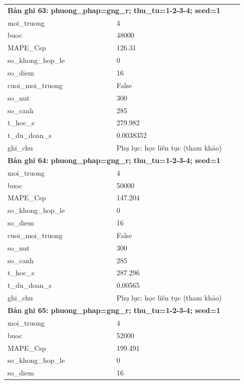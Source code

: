 \begin{longtable}{p{0.43\linewidth}p{0.50\linewidth}}
\midrule
\multicolumn{2}{p{0.95\linewidth}}{\textbf{Bản ghi 63: phuong\_phap=gng\_r; thu\_tu=1-2-3-4; seed=1}} \\
moi\_\allowbreak truong & 4 \\
buoc & 48000 \\
MAPE\_\allowbreak Csp & 126.31 \\
so\_\allowbreak khong\_\allowbreak hop\_\allowbreak le & 0 \\
so\_\allowbreak diem & 16 \\
cuoi\_\allowbreak moi\_\allowbreak truong & False \\
so\_\allowbreak nut & 300 \\
so\_\allowbreak canh & 285 \\
t\_\allowbreak hoc\_\allowbreak s & 279.982 \\
t\_\allowbreak du\_\allowbreak doan\_\allowbreak s & 0.0038352 \\
ghi\_\allowbreak chu & Phụ lục: học liên tục (tham khảo) \\
\midrule
\multicolumn{2}{p{0.95\linewidth}}{\textbf{Bản ghi 64: phuong\_phap=gng\_r; thu\_tu=1-2-3-4; seed=1}} \\
moi\_\allowbreak truong & 4 \\
buoc & 50000 \\
MAPE\_\allowbreak Csp & 147.204 \\
so\_\allowbreak khong\_\allowbreak hop\_\allowbreak le & 0 \\
so\_\allowbreak diem & 16 \\
cuoi\_\allowbreak moi\_\allowbreak truong & False \\
so\_\allowbreak nut & 300 \\
so\_\allowbreak canh & 285 \\
t\_\allowbreak hoc\_\allowbreak s & 287.296 \\
t\_\allowbreak du\_\allowbreak doan\_\allowbreak s & 0.00565 \\
ghi\_\allowbreak chu & Phụ lục: học liên tục (tham khảo) \\
\midrule
\multicolumn{2}{p{0.95\linewidth}}{\textbf{Bản ghi 65: phuong\_phap=gng\_r; thu\_tu=1-2-3-4; seed=1}} \\
moi\_\allowbreak truong & 4 \\
buoc & 52000 \\
MAPE\_\allowbreak Csp & 199.491 \\
so\_\allowbreak khong\_\allowbreak hop\_\allowbreak le & 0 \\
so\_\allowbreak diem & 16 \\

\end{longtable}
